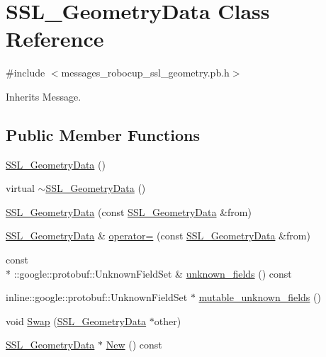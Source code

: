 \hypertarget{class_s_s_l___geometry_data}{\section{S\-S\-L\-\_\-\-Geometry\-Data Class Reference}
\label{class_s_s_l___geometry_data}
}


{\ttfamily \#include $<$messages\-\_\-robocup\-\_\-ssl\-\_\-geometry.\-pb.\-h$>$}



Inherits Message.

\subsection*{Public Member Functions}
\begin{DoxyCompactItemize}
\item 
\hyperlink{class_s_s_l___geometry_data_a53ab9b3a85c759888cd9abc1d288b57f}{S\-S\-L\-\_\-\-Geometry\-Data} ()
\item 
virtual \hyperlink{class_s_s_l___geometry_data_ad6a0745e4690f23232a5756fba833753}{$\sim$\-S\-S\-L\-\_\-\-Geometry\-Data} ()
\item 
\hyperlink{class_s_s_l___geometry_data_a13f0845dafdaa9f50cd34eb0f42b3b6a}{S\-S\-L\-\_\-\-Geometry\-Data} (const \hyperlink{class_s_s_l___geometry_data}{S\-S\-L\-\_\-\-Geometry\-Data} \&from)
\item 
\hyperlink{class_s_s_l___geometry_data}{S\-S\-L\-\_\-\-Geometry\-Data} \& \hyperlink{class_s_s_l___geometry_data_a1918cad1dce82164681f7bf2d0f412a9}{operator=} (const \hyperlink{class_s_s_l___geometry_data}{S\-S\-L\-\_\-\-Geometry\-Data} \&from)
\item 
const \\*
\-::google\-::protobuf\-::\-Unknown\-Field\-Set \& \hyperlink{class_s_s_l___geometry_data_a2536bfb94611783da06e38e3619bdc4d}{unknown\-\_\-fields} () const 
\item 
inline\-::google\-::protobuf\-::\-Unknown\-Field\-Set $\ast$ \hyperlink{class_s_s_l___geometry_data_a10245a92e4e961f8bb3dc7c7354d38c0}{mutable\-\_\-unknown\-\_\-fields} ()
\item 
void \hyperlink{class_s_s_l___geometry_data_a0072ece65c35838c63ac2f831c4b627b}{Swap} (\hyperlink{class_s_s_l___geometry_data}{S\-S\-L\-\_\-\-Geometry\-Data} $\ast$other)
\item 
\hyperlink{class_s_s_l___geometry_data}{S\-S\-L\-\_\-\-Geometry\-Data} $\ast$ \hyperlink{class_s_s_l___geometry_data_aa3b4fd331db64f949992b334ccceef9a}{New} () const 

\end{DoxyCompactItemize}
